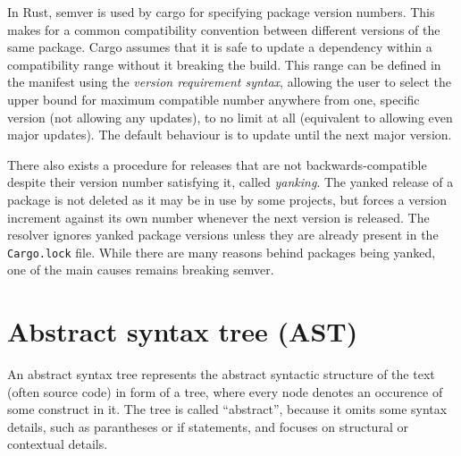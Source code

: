 \documentclass[licencjacka,en]{pracamgr}
\begin{document}
In Rust, semver is used by cargo for specifying package version numbers. This makes for a common
compatibility convention between different versions of the same package. Cargo assumes that
it is safe to update a dependency within a compatibility range without it breaking the build.
This range can be defined in the manifest using the \textit{version requirement syntax}, allowing
the user to select the upper bound for maximum compatible number anywhere from one, specific
version (not allowing any updates), to no limit at all (equivalent to allowing even major updates).
The default behaviour is to update until the next major version.


There also exists a procedure for releases that are not backwards-compatible despite their version
number satisfying it, called \textit{yanking}. The yanked release of a package is not
deleted as it may be in use by some projects, but forces a version increment against its own number
whenever the next version is released. The resolver ignores yanked package versions unless they are
already present in the \texttt{Cargo.lock} file. While there are many reasons behind packages being
yanked, one of the main causes remains breaking semver.

\section{Abstract syntax tree (AST)}

An abstract syntax tree represents the abstract syntactic structure of the text (often source code)
in form of a tree, where every node denotes an occurence of some construct in it. The tree is
called ``abstract'', because it omits some syntax details, such as parantheses or if statements,
and focuses on structural or contextual details.
\end{document}
